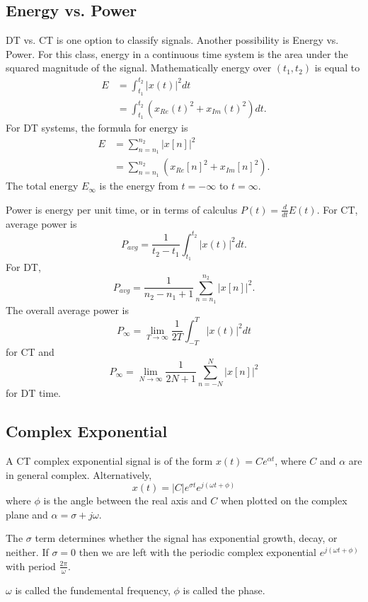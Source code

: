 \subsection{Energy vs. Power}
DT vs. CT is one option to classify signals. Another
possibility is Energy vs. Power. For this class, energy in a continuous
time system is the area under the squared magnitude of the signal. Mathematically
energy over $(t_1, t_2)$ is equal to
\begin{align}
    E & = \int_{t_1}^{t_2} |x(t)|^2 dt                     \\
      & = \int_{t_1}^{t_2} (x_{Re}(t)^2 + x_{Im}(t)^2) dt.
\end{align}
For DT systems, the formula for energy is
\begin{align}
    E & = \sum_{n=n_1}^{n_2} |x[n]|^2                     \\
      & = \sum_{n=n_1}^{n_2} (x_{Re}[n]^2 + x_{Im}[n]^2).
\end{align}
The total energy $E_\infty$ is the energy from $t = -\infty$ to $t = \infty$.

Power is energy per unit time, or in terms of calculus $P(t) = \frac{d}{dt}E(t)$.
For CT, average power is
\begin{equation}
    P_{avg} = \frac{1}{t_2 - t_1} \int_{t_1}^{t_2} |x(t)|^2 dt.
\end{equation}
For DT,
\begin{equation}
    P_{avg} = \frac{1}{n_2 - n_1 + 1} \sum_{n=n_1}^{n_2} |x[n]|^2.
\end{equation}
The overall average power is
\begin{equation}
    P_{\infty} = \lim_{T \rightarrow \infty} \frac{1}{2T} \int_{-T}^{T} |x(t)|^2 dt
\end{equation}
for CT and
\begin{equation}
    P_{\infty} = \lim_{N \rightarrow \infty} \frac{1}{2N + 1} \sum_{n=-N}^{N} |x[n]|^2
\end{equation}
for DT time.

\subsection{Complex Exponential}
A CT complex exponential signal is of the form 
$x(t) = Ce^{\alpha t}$, where $C$ and $\alpha$ 
are in general complex. Alternatively, 
\begin{equation}
    x(t) = |C| e^{\sigma t} e^{j(\omega t + \phi)}
\end{equation}
where $\phi$ is the angle between the real axis and 
$C$ when plotted on the complex plane and $\alpha = \sigma + j\omega$. 

The $\sigma$ term determines whether the signal has exponential 
growth, decay, or neither. If $\sigma = 0$ then we are left 
with the periodic complex exponential $e^{j(\omega t + \phi)}$ 
with period $\frac{2\pi}{\omega}$. 

$\omega$ is called the fundemental frequency, 
$\phi$ is called the phase. 